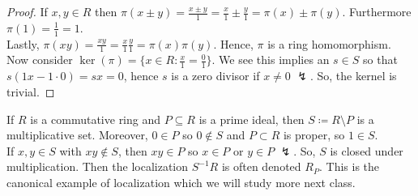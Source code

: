 \begin{proof}
	If \(x, y \in R\) then \(\pi\left( x \pm y \right) = \frac{x \pm y}{1} = \frac{x}{1} \pm \frac{y}{1} = \pi\left( x \right) \pm \pi\left( y \right) \). Furthermore \(\pi\left( 1 \right) = \frac{1}{1} = 1\).\\
	Lastly, \(\pi\left( xy \right) = \frac{xy}{1} = \frac{x}{1}\frac{y}{1} = \pi\left( x \right) \pi\left( y \right) \). Hence, \(\pi\) is a ring homomorphism. Now consider \(\ker \left( \pi \right) = \{x \in R : \frac{x}{1} = \frac{0}{1}\} \). We see this implies an \(s \in S\) so that \(s\left( 1x - 1\cdot 0 \right) = sx = 0 \), hence \(s\) is a zero divisor if \(x \neq 0\) \(\lightning\). So, the kernel is trivial.
\end{proof}
\begin{example}
	If \(R\) is a commutative ring and \(P \subseteq R\) is a prime ideal, then \(S \coloneqq R \setminus P\) is a multiplicative set. Moreover, \(0 \in P\) so \( 0 \not\in S\)  and \(P \subset R\) is proper, so \(1 \in S\).\\
	If \(x, y \in S\) with \(xy \not\in S\), then \(xy \in P\) so \(x \in P\) or \(y \in P\) \(\lightning\). So, \(S\) is closed under multiplication. Then the localization \(S^{-1} R\) is often denoted \(R_{P}\). This is the canonical example of localization which we will study more next class.
\end{example}

